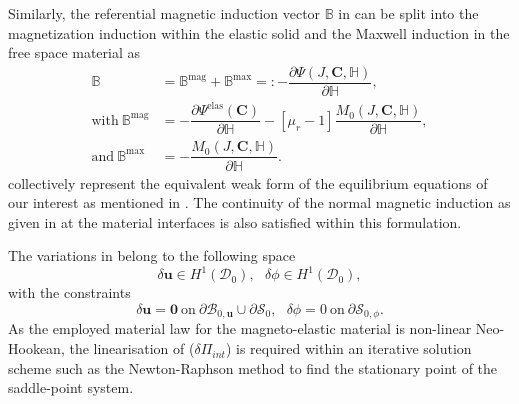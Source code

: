Similarly, the referential magnetic induction vector $\mathbb{B}$ in  can be split into the magnetization induction within the elastic solid and the Maxwell induction in the free space material as
\begin{align}
\mathbb{B} &= \mathbb{B}^{\text{mag}} + \mathbb{B}^{\text{max}} =: -\dfrac{\partial \Psi (J, \mathbf{C}, \mathbb{H})}{\partial \mathbb{H}}, \\
\text{with} \ \mathbb{B}^{\text{mag}} &= -\dfrac{\partial \Psi^{\text{elas}} (\mathbf{C})}{\partial \mathbb{H}} - \left[ \mu_r - 1 \right] \dfrac{M_0 (J, \mathbf{C}, \mathbb{H})}{\partial \mathbb{H}}, \\
\text{and} \ \mathbb{B}^{\text{max}} &= -\dfrac{M_0 (J, \mathbf{C}, \mathbb{H})}{\partial \mathbb{H}}.
\end{align}
 collectively represent the equivalent weak form of the equilibrium equations of our interest as mentioned in . The continuity of the normal magnetic induction as given in  at the material interfaces is also satisfied within this formulation. \par 

\noindent The variations in  belong to the following space
\begin{equation}
\delta \mathbf{u} \in H^1 (\mathcal{D}_0), \ \ \ \delta \phi \in H^1 (\mathcal{D}_0),
\end{equation}
with the constraints 
\begin{equation}
\delta \mathbf{u} = \mathbf{0} \ \text{on} \ \partial \mathcal{B}_{0,\mathbf{u}} \cup \partial \mathcal{S}_0, \ \ \ \delta \phi = 0 \ \text{on} \ \partial \mathcal{S}_{0,\phi}.
\end{equation}
As the employed material law for the magneto-elastic material is non-linear Neo-Hookean, the linearisation of  ($\delta \Pi_{int}$) is required within an iterative solution scheme such as the Newton-Raphson method to find the stationary point of the saddle-point system. 

